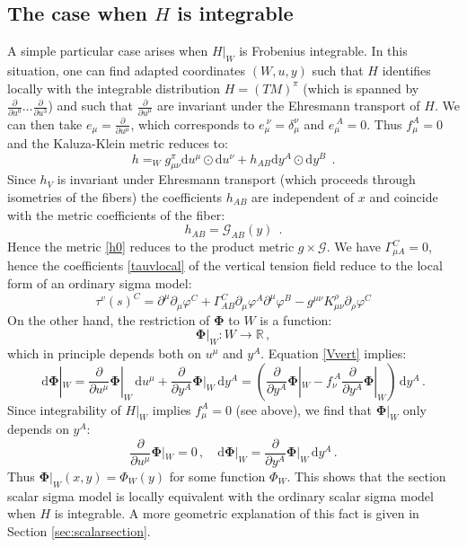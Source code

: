 \documentclass[10pt, cmp, numbook, final, a4paper]{svjour}
\newcommand*{\SavedEqref}{}
\let\SavedEqref\eqref
\renewcommand*{\eqref}[1]{%
  \begingroup
    \hypersetup{
      linkcolor=blue,
      linkbordercolor=blue,
    }%
    \SavedEqref{#1}%
  \endgroup
}
\def\R{\mathbb{R}}
\def\dd{\mathrm{d}}
\newcommand{\be}{\begin{equation*}}
\newcommand{\ee}{\end{equation*}}
\newcommand{\ben}{\begin{equation}}
\newcommand{\een}{\end{equation}}
\def\cG{\mathcal{G}}
\def\bPhi{\mathbf{\Phi}}
\begin{document}
\subsection{The case when $H$ is integrable}
\label{subsec:Hintlocal}
A simple particular case arises when $H|_W$ is Frobenius
integrable. In this situation, one can find adapted coordinates
$(W,u,y)$ such that $H$ identifies locally with the integrable
distribution $H=(TM)^\pi$ (which is spanned by
$\frac{\partial}{\partial u^0}\ldots \frac{\partial}{\partial u^3}$)
and such that $\frac{\partial}{\partial u^\mu}$ are invariant under
the Ehresmann transport of $H$.  We can then take
$e_\mu=\frac{\partial}{\partial u^\mu}$, which corresponds to
$e_\mu^{~\nu}=\delta_\mu^\nu$ and $e_\mu^{~A}=0$. Thus $f_\mu^A=0$ and
the Kaluza-Klein metric reduces to:
\ben
\label{h0}
h=_W g_{\mu\nu}^\pi \dd u^\mu\odot \dd u^\nu+h_{AB} \dd y^A \odot \dd y^B~~.
\een
Since $h_{V}$ is invariant under Ehresmann transport (which proceeds
through isometries of the fibers) the coefficients $h_{AB}$ are
independent of $x$ and coincide with the metric coefficients of the
fiber:
\ben
\label{hflat}
h_{AB}=\cG_{AB}(y)~~.
\een
Hence the metric \eqref{h0} reduces to the product metric $g\times
\cG$. We have $\Gamma_{\mu A}^C=0$, hence the coefficients
\eqref{tauvlocal} of the vertical tension field reduce to the local
form of an ordinary sigma model:
\be
\tau^v(s)^C=\partial^\mu\partial_\mu \varphi^C+\Gamma^C_{AB}\partial_\mu\varphi^A\partial^\mu\varphi^B - 
g^{\mu\nu}K_{\mu\nu}^\rho \partial_\rho\varphi^C
\ee
On the other hand, the restriction of $\bPhi$ to $W$ is a function:
\begin{equation}
\bPhi|_{W}\colon W\to \R\, ,
\end{equation}
which in principle depends both on $u^{\mu}$ and $y^{A}$. 
Equation \eqref{Vvert} implies:
\begin{equation}
\dd\bPhi|_{W} = \frac{\partial}{\partial u^{\mu}} \bPhi|_{W}\, \dd u^{\mu} + 
\frac{\partial}{\partial y^{A}} \bPhi|_{W}\, \dd y^{A}= \left( \frac{\partial}{\partial y^{A}} \bPhi|_{W} - f^{~A}_{\nu}\frac{\partial}{\partial y^{A}} \bPhi|_{W}\right)\, \dd y^A\, .
\end{equation}  
Since integrability of $H|_W$ implies $f^{A}_{\mu} = 0$ (see above), we
find that $\bPhi|_W$ only depends on $y^{A}$:
\begin{equation}
\frac{\partial}{\partial u^{\mu}} \bPhi|_{W} = 0\, , \quad \dd\bPhi|_{W} = \frac{\partial}{\partial y^{A}} \bPhi|_{W}\, \dd y^A\, . 
\end{equation}
Thus $\bPhi|_W(x,y)=\Phi_W(y)$ for some function $\Phi_W$. This shows
that the section scalar sigma model is locally equivalent with the
ordinary scalar sigma model when $H$ is integrable. A more geometric
explanation of this fact is given in Section
\ref{sec:scalarsection}.
\end{document}
